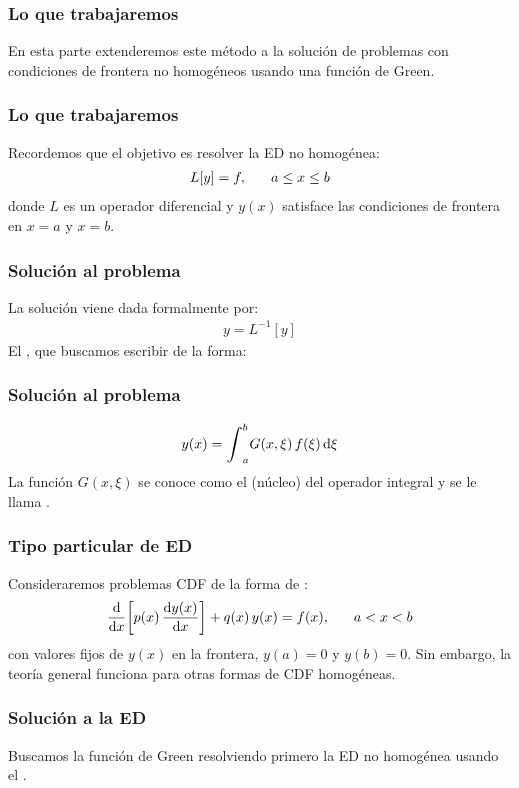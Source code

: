 \documentclass[12pt]{beamer}
\begin{document}
\begin{frame}
\frametitle{Lo que trabajaremos}
En esta parte extenderemos este método a la solución de problemas con condiciones de frontera no homogéneos usando una función de Green.
\end{frame}
\begin{frame}
\frametitle{Lo que trabajaremos}
Recordemos que el objetivo es resolver la ED no homogénea:
\pause
\begin{align*}
L [y] = f, \hspace{0.6cm} a \leq x \leq b
\end{align*}
donde $L$ es un operador diferencial y $y (x)$ satisface las condiciones de frontera en $x = a$ y $x = b$.
\end{frame}
\begin{frame}
\frametitle{Solución al problema}
La solución viene dada formalmente por:
\pause
\begin{align*}
y = L^{-1} [y]
\end{align*}
\pause
El , que buscamos escribir de la forma:
\end{frame}
\begin{frame}
\frametitle{Solución al problema}
\begin{align*}
y (x) = \scaleint{6ex}_{a}^{b} G (x, \xi) \, f (\xi) \dd{\xi} 
\end{align*}
La función $G (x, \xi)$ se conoce como el  (núcleo) del operador integral y se le llama .
\end{frame}
\begin{frame}
\frametitle{Tipo particular de ED}
Consideraremos problemas CDF de la forma de :
\pause
\begin{align}
\dv{x} \bigg[ p (x) \, \dv{y (x)}{x} \bigg] + q (x) \, y (x) = f (x), \hspace{0.6cm} a < x < b
\label{eq:ecuacion_07_25}
\end{align}
con valores fijos de $y (x)$ en la frontera, $y (a) = 0$ y $y (b) = 0$. \pause Sin embargo, la teoría general funciona para otras formas de CDF homogéneas.
\end{frame}
\begin{frame}
\frametitle{Solución a la ED}
Buscamos la función de Green resolviendo primero la ED no homogénea usando el .
\end{frame}
\end{document}
